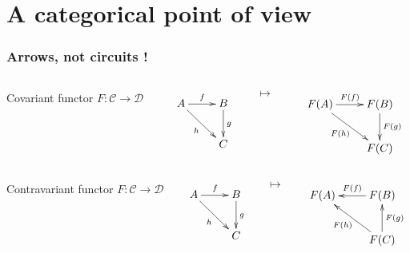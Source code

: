 \documentclass[10pt]{beamer}
\newcommand{\cat}[1]{\mathscr{#1}}
\newcommand{\C}{\cat{C}}
\newcommand{\D}{\cat{D}}
\newcommand{\ra}{\rightarrow}
\begin{document}

\section{A categorical point of view}

\begin{frame}
  \frametitle{Arrows, not circuits !}

  \begin{columns}
    \begin{column}{0.3\textwidth}
      Covariant functor $F:\C\ra\D$
    \end{column}

    \begin{column}{0.25\textwidth}
      \begin{equation*}
        \xymatrix{
          A \ar[r]^f \ar[dr]_{h} & B \ar[d]^g \\
          & C
        }
      \end{equation*}
    \end{column}
    \begin{column}{0.05\textwidth}
      $\mapsto$
    \end{column}
    \begin{column}{0.35\textwidth}
      \begin{equation*}
        \xymatrix{
          F(A) \ar[r]^{F(f)} \ar[dr]_{F(h)} & F(B) \ar[d]^{F(g)} \\
          & F(C)
        }    
      \end{equation*}
    \end{column}
  \end{columns}

  \begin{columns}
    \begin{column}{0.3\textwidth}
      Contravariant functor $F:\C\ra\D$
    \end{column}

    \begin{column}{0.25\textwidth}
      \begin{equation*}
        \xymatrix{
          A \ar[r]^f \ar[dr]_{h} & B \ar[d]^g \\
          & C
        }
      \end{equation*}
    \end{column}
    \begin{column}{0.05\textwidth}
      $\mapsto$
    \end{column}
    \begin{column}{0.35\textwidth}
      \begin{equation*}
        \xymatrix{
          F(A) & F(B) \ar[l]_{F(f)} \\
          & F(C) \ar[u]_{F(g)} \ar[ul]^{F(h)}
        }    
      \end{equation*}
    \end{column}
  \end{columns}


\end{frame}
\end{document}
